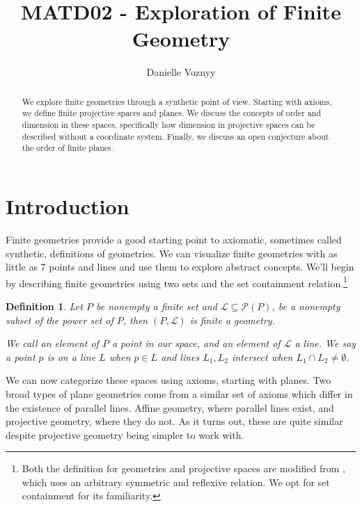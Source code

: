 \documentclass[12pt]{article}
\title{MATD02 - Exploration of Finite Geometry }
\author{Danielle Voznyy}
\date{}
\newtheorem{definition}{Definition}
\begin{document}
    \maketitle

    \begin{abstract}
        We explore finite geometries through a synthetic point of view.
        Starting with axioms, we define finite projective spaces and planes.
        We discuss the concepts of order and dimension in these spaces,
        specifically how dimension in projective spaces can be described without a coordinate system.
        Finally, we discuss an open conjecture about the order of finite planes.
    \end{abstract}


    \section{Introduction}

    Finite geometries provide a good starting point to axiomatic, sometimes called synthetic, definitions of geometries.
    We can visualize finite geometries with as little as 7 points and lines and use them to explore abstract concepts.
    We'll begin by describing finite geometries using two sets and the set containment relation.\footnote{
        Both the definition for geometries and projective spaces are modified from \cite[p.~1,7]{beutelspacher_projective_1998},
        which uses an arbitrary symmetric and reflexive relation.
        We opt for set containment for its familiarity.}

    \begin{definition}
        Let $P$ be nonempty a finite set and $\mathcal{L} \subseteq \mathcal{P}(P)$, be a nonempty subset of the power set of $P$,
        then $(P, \mathcal{L})$ is finite a geometry.

        We call an element of $P$ a point in our space, and an element of $\mathcal{L}$ a line.
        We say a point $p$ is on a line $L$ when $p \in L$ and lines $L_1, L_2$ intersect when $L_1 \cap L_2 \neq \emptyset$.
    \end{definition}

    We can now categorize these spaces using axioms, starting with planes.
    Two broad types of plane geometries come from a similar set of axioms which differ in the existence of parallel lines.
    Affine geometry, where parallel lines exist, and projective geometry, where they do not.
    As it turns out, these are quite similar despite projective geometry being simpler to work with.
\end{document}
